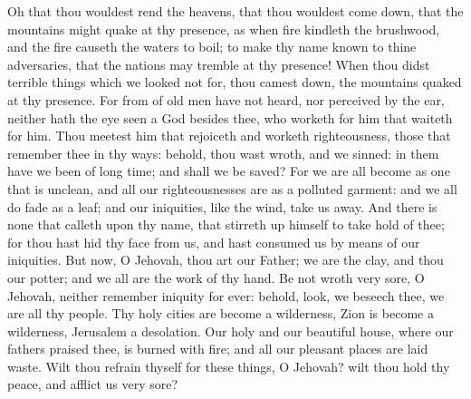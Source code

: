 Oh that thou wouldest rend the heavens, that thou wouldest come down, that the mountains might quake at thy presence, as when fire kindleth the brushwood, and the fire causeth the waters to boil; to make thy name known to thine adversaries, that the nations may tremble at thy presence! When thou didst terrible things which we looked not for, thou camest down, the mountains quaked at thy presence. For from of old men have not heard, nor perceived by the ear, neither hath the eye seen a God besides thee, who worketh for him that waiteth for him. Thou meetest him that rejoiceth and worketh righteousness, those that remember thee in thy ways: behold, thou wast wroth, and we sinned: in them have we been of long time; and shall we be saved? For we are all become as one that is unclean, and all our righteousnesses are as a polluted garment: and we all do fade as a leaf; and our iniquities, like the wind, take us away. And there is none that calleth upon thy name, that stirreth up himself to take hold of thee; for thou hast hid thy face from us, and hast consumed us by means of our iniquities.  But now, O Jehovah, thou art our Father; we are the clay, and thou our potter; and we all are the work of thy hand. Be not wroth very sore, O Jehovah, neither remember iniquity for ever: behold, look, we beseech thee, we are all thy people. Thy holy cities are become a wilderness, Zion is become a wilderness, Jerusalem a desolation. Our holy and our beautiful house, where our fathers praised thee, is burned with fire; and all our pleasant places are laid waste. Wilt thou refrain thyself for these things, O Jehovah? wilt thou hold thy peace, and afflict us very sore? 

